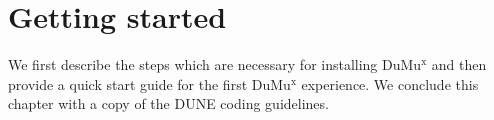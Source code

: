 \chapter{Getting started}

We first describe the steps which are necessary for installing DuMu$^\text{x}$ 
and then provide a quick start guide for the first DuMu$^\text{x}$ experience. 
We conclude this chapter with a copy of the DUNE coding guidelines. 




